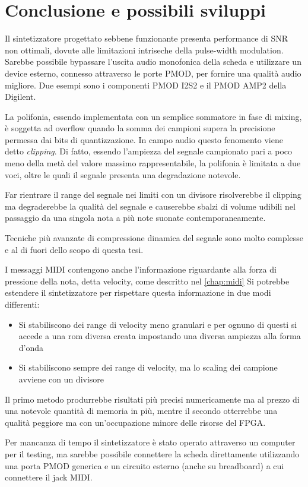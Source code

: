 \chapter{Conclusione e possibili sviluppi}

Il sintetizzatore progettato sebbene funzionante presenta performance
di SNR non ottimali, dovute alle limitazioni intriseche della pulse-width 
modulation.
Sarebbe possibile bypassare l'uscita audio monofonica della scheda
e utilizzare un device esterno, connesso attraverso le porte PMOD, 
per fornire una qualità audio migliore.
Due esempi sono i componenti PMOD I2S2 e il PMOD AMP2 della Digilent.

La polifonia, essendo implementata con un semplice sommatore in fase 
di mixing, è soggetta ad overflow quando la somma dei campioni supera
la precisione permessa dai  bits di quantizzazione.
In campo audio questo fenomento viene detto \textit{clipping}.
Di fatto, essendo l'ampiezza del segnale campionato pari a poco meno
della metà del valore massimo rappresentabile, la polifonia è limitata
a due voci, oltre le quali il segnale presenta una degradazione
notevole.

Far rientrare il range del segnale nei limiti con un divisore risolverebbe
il clipping ma degraderebbe la qualità del segnale e causerebbe
sbalzi di volume udibili nel passaggio da una singola nota  a più note
suonate contemporaneamente.

Tecniche più avanzate di compressione dinamica del segnale 
sono molto complesse e al di fuori dello scopo di questa tesi.  

I messaggi MIDI contengono anche l'informazione riguardante alla forza
di pressione della nota, detta velocity, come descritto nel \cref{chap:midi}
Si potrebbe estendere il sintetizzatore per rispettare questa informazione
in due modi differenti:
\begin{itemize}
  \item Si stabiliscono dei range di velocity meno granulari  e per ognuno
        di questi si accede a una rom diversa creata impostando una diversa 
        ampiezza alla forma d'onda
  \item Si stabiliscono sempre dei range di velocity, ma lo scaling dei
        campione avviene con un divisore
\end{itemize}
Il primo metodo produrrebbe risultati più precisi numericamente ma al
prezzo di una notevole quantità di memoria in più, mentre il secondo
otterrebbe una qualità peggiore ma con un'occupazione minore delle
risorse del FPGA.

Per mancanza di tempo il sintetizzatore è stato operato attraverso un 
computer per il testing, ma sarebbe possibile connettere la scheda
direttamente utilizzando una porta PMOD generica e un circuito esterno
(anche su breadboard) a cui connettere il jack MIDI.
